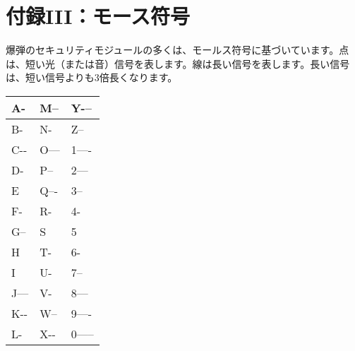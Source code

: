 \section*{付録III：モース符号}

爆弾のセキュリティモジュールの多くは、モールス符号に基づいています。点は、短い光（または音）信号を表します。線は長い信号を表します。長い信号は、短い信号よりも3倍長くなります。

\vspace*{1em}

\newcommand{\dt}{\kern-0.5pt\raisebox{0.4ex}{.}}

\bgroup
\Large
\def\arraystretch{1.5}
\begin{tabular}{|p{}|p{}|p{}|}
\hline
A\quad \dt-         & M\quad --         & Y\quad -\dt-- \\ \hline
B\quad -\dt\dt\dt   & N\quad -\dt       & Z\quad --\dt\dt \\ \hline
C\quad -\dt-\dt     & O\quad ---        & 1\quad \dt---- \\ \hline
D\quad -\dt\dt      & P\quad \dt--\dt   & 2\quad \dt\dt--- \\ \hline
E\quad \dt          & Q\quad --\dt-     & 3\quad \dt\dt\dt-- \\ \hline
F\quad \dt\dt-\dt   & R\quad \dt-\dt    & 4\quad \dt\dt\dt\dt- \\ \hline
G\quad --\dt        & S\quad \dt\dt\dt  & 5\quad \dt\dt\dt\dt\dt \\ \hline
H\quad \dt\dt\dt\dt & T\quad -          & 6\quad -\dt\dt\dt\dt \\ \hline
I\quad \dt\dt       & U\quad \dt\dt-    & 7\quad --\dt\dt\dt \\ \hline
J\quad \dt---       & V\quad \dt\dt\dt- & 8\quad ---\dt\dt \\ \hline
K\quad -\dt-        & W\quad \dt--      & 9\quad ----\dt \\ \hline
L\quad \dt-\dt\dt   & X\quad -\dt\dt-   & 0\quad ----- \\ \hline
\end{tabular}
\egroup